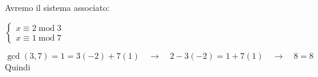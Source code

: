 \begin{flushleft}
\begin{boxA}
        \begin{flushleft}
            Avremo il sistema associato: 

            $\begin{cases}
                x \equiv 2 \; \text{mod} \; 3 \\
                x \equiv 1 \; \text{mod} \; 7
            \end{cases}$ 

            $\gcd (3, 7) = 1 = 3 (-2) + 7 (1) \quad \rightarrow \quad 2 - 3(-2) = 1 + 7(1) \quad \rightarrow \quad 8 = 8$ \\
            Quindi 
        \end{flushleft}
    \end{boxA}
\end{flushleft}

